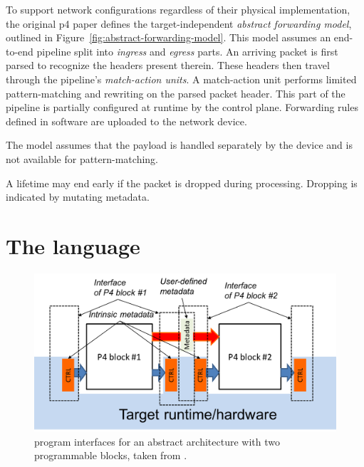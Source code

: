 To support network configurations regardless of their physical implementation,
the original \acrshort{p4} paper defines the target-independent \emph{abstract
forwarding model}, outlined in Figure~\ref{fig:abstract-forwarding-model}. This
model assumes an end-to-end pipeline split into \emph{ingress} and \emph{egress}
parts. An arriving packet is first parsed to recognize the headers present
therein. These headers then travel through the pipeline's \emph{match-action
units}. A match-action unit performs limited pattern-matching and rewriting on
the parsed packet header. This part of the pipeline is partially configured at
runtime by the control plane. Forwarding rules defined in software are uploaded
to the network device.


The model assumes that the payload is handled separately by the device and is
not available for pattern-matching.


A lifetime may end early if the packet is dropped during processing. Dropping is
indicated by mutating metadata.

\section{The \pfs language}

\begin{figure}[t]
	\includegraphics[width=1.00\textwidth]{resources/p4_16-architecture-model.png}

	\caption{\pfs program interfaces for an abstract architecture with two
	programmable blocks, taken from \cite{p416:v123:spec}.}
	\label{fig:arch-model}
\end{figure}

